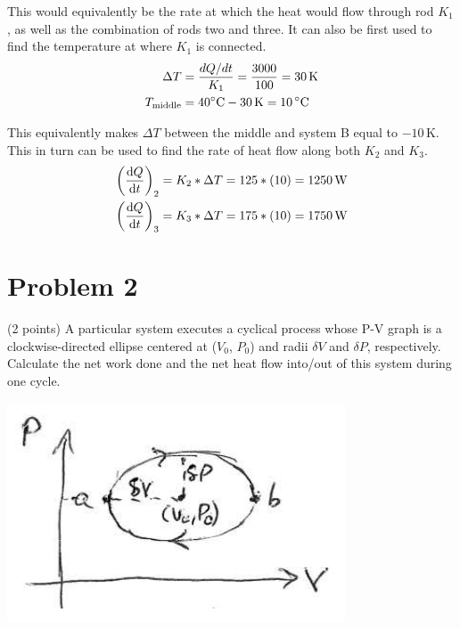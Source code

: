 \documentclass[12pt]{article}
\begin{document}
            This would equivalently be the rate at which the heat would flow through rod $K_1$, as well as the combination of rods two and three.
            It can also be first used to find the temperature at where $K_1$ is connected.
            \begin{align}
                \Delta T    &=  \frac{dQ/dt}{K_1}
                    =   \frac{3000}{100}
                    =   30\,\unit{\kelvin}\\
                T_{\rm middle}  &=  40\unit{\celsius} - 30\,\unit{\kelvin}
                    =   10\,\unit{\celsius}
            \end{align}

            This equivalently makes $\Delta T$ between the middle and system B equal to $-10\,\unit{\kelvin}$. 
            This in turn can be used to find the rate of heat flow along both $K_2$ and $K_3$.
            \begin{align}
                \left( \dv{Q}{t} \right)_2  &=  K_2 * \Delta T
                    =   125 * (10)
                    =   1250\,\unit{\watt}\\
                \left( \dv{Q}{t} \right)_3  &=  K_3 * \Delta T
                    =   175 * (10)
                    =   1750\,\unit{\watt}
            \end{align}

    \pagebreak
    \section{Problem 2}
        (2 points) A particular system executes a cyclical process whose P-V graph is a clockwise-directed ellipse centered at ($V_0$, $P_0$) and radii $\delta V$ and $\delta P$, respectively. 
        Calculate the net work done and the net heat ﬂow into/out of this system during one cycle.
        \begin{center}
            \includegraphics{picture_2.png}
        \end{center}
\end{document}
